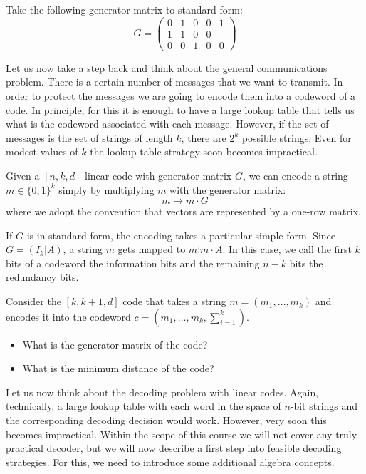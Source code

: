 \begin{exercise}
Take the following generator matrix to standard form:
\begin{equation}
G=\begin{pmatrix}
0 & 1 &0 &0 &1\\
1 & 1& 0 & 0 &\\
0 & 0 & 1  &0 & 0
\end{pmatrix}
\end{equation}
\end{exercise}

Let us now take a step back and think about the general communications problem. There is a certain number of messages that we want to transmit. In order to protect the messages we are going to encode them into a codeword of a code. In principle, for this it is enough to have a large lookup table that tells us what is the codeword associated with each message. However, if the set of messages is the set of strings of length $k$, there are $2^k$ possible strings. Even for modest values of $k$ the lookup table strategy soon becomes impractical.

Given a $[n,k,d]$ linear code with generator matrix $G$, we can encode a string $m\in\{0,1\}^k$ simply by multiplying $m$ with the generator matrix:
\begin{equation}
m\mapsto m\cdot G
\end{equation}
where we adopt the convention that vectors are represented by a one-row matrix.

If $G$ is in standard form, the encoding takes a particular simple form. Since $G=(I_k|A)$, a string $m$ gets mapped to $m|m\cdot A$. In this case, we call the first $k$ bits of a codeword the information bits and the remaining $n-k$ bits the redundancy bits.

\begin{exercise}
\label{ex:paritycode}
Consider the $[k,k+1,d]$ code that takes a string $m=(m_1,\ldots,m_k)$ and encodes it into the codeword $c=(m_1,\ldots,m_k,\sum_{i=1}^k)$.
\begin{itemize}
\item What is the generator matrix of the code?
\item What is the minimum distance of the code?
\end{itemize}
\end{exercise}
Let us now think about the decoding problem with linear codes. Again, technically, a large lookup table with each word in the space of $n$-bit strings and the corresponding decoding decision would work. However, very soon this becomes impractical. Within the scope of this course we will not cover any truly practical decoder, but we will now describe a first step into feasible decoding strategies. For this, we need to introduce some additional algebra concepts.

